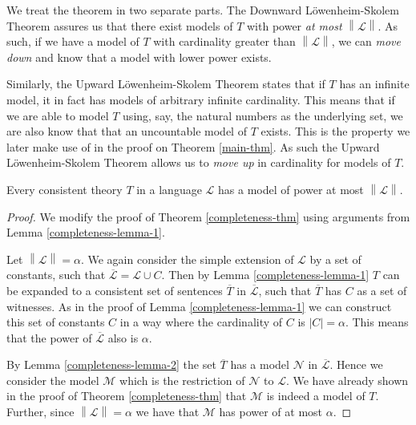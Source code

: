 \documentclass[../../main.tex]{subfiles}
\begin{document}
We treat the theorem in two separate parts.
The Downward Löwenheim-Skolem Theorem assures us that there exist models of $T$ with power \emph{at most} $\left\lVert \mathcal{L}\right\rVert$.
As such, if we have a model of $T$ with cardinality greater than $\left\lVert \mathcal{L} \right\rVert$, 
we can \emph{move down} and know that a model with lower power exists.

Similarly, the Upward Löwenheim-Skolem Theorem states that if $T$ has an infinite model, it in fact has models of arbitrary infinite cardinality.
This means that if we are able to model $T$ using, say, the natural numbers as the underlying set,
we are also know that that an uncountable model of $T$ exists.
This is the property we later make use of in the proof on Theorem \ref{main-thm}.
As such the Upward Löwenheim-Skolem Theorem allows us to \emph{move up} in cardinality for models of $T$.

\begin{theorem}\label{down-lowenheim-skolem}\cite[Corollary 2.1.4]{Cha90}
    Every consistent theory $T$ in a language $\mathcal{L}$ has a model of power at most $\left\lVert \mathcal{L} \right\rVert$.
\end{theorem}

\begin{proof}
    We modify the proof of Theorem \ref{completeness-thm} using arguments from Lemma \ref{completeness-lemma-1}.

    Let $\left\lVert \mathcal{L} \right\rVert = \alpha$.
    We again consider the simple extension of $\mathcal{L}$ by a set of constants, such that $\overline{\mathcal{L}} = \mathcal{L} \cup C$.
    Then by Lemma \ref{completeness-lemma-1} $T$ can be expanded to a consistent set of sentences $\overline{T}$ in $\overline{\mathcal{L}}$, 
    such that $\overline{T}$ has $C$ as a set of witnesses.
    As in the proof of Lemma \ref{completeness-lemma-1} we can construct this set of constants $C$ in a way where the cardinality of $C$ is $\left\lvert C\right\rvert = \alpha$.
    This means that the power of $\overline{\mathcal{L}}$ also is $\alpha$.

    By Lemma \ref{completeness-lemma-2} the set $\overline{T}$ has a model $\mathcal{N}$ in $\overline{\mathcal{L}}$.
    Hence we consider the model $\mathcal{M}$ which is the restriction of $\mathcal{N}$ to $\mathcal{L}$.
    We have already shown in the proof of Theorem \ref{completeness-thm} that $\mathcal{M}$ is indeed a model of $T$.
    Further, since $\left\lVert \mathcal{L} \right\rVert = \alpha$ we have that $\mathcal{M}$ has power of at most $\alpha$.
\end{proof}
\end{document}
